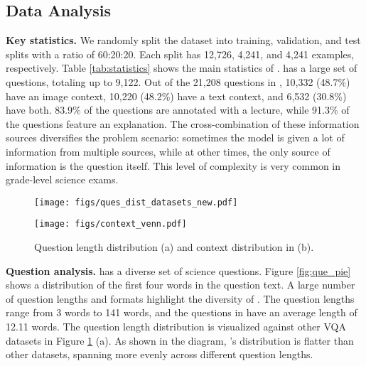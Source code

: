 \subsection{Data Analysis}

\textbf{Key statistics.} We randomly split the dataset into training, validation, and test splits with a ratio of 60:20:20. Each split has 12,726, 4,241, and 4,241 examples, respectively. Table \ref{tab:statistics} shows the main statistics of \name{}. \name{} has a large set of  questions, totaling up to 9,122. Out of the 21,208 questions in \name{}, 10,332 (48.7\%) have an image context, 10,220 (48.2\%) have a text context, and 6,532 (30.8\%) have both. 83.9\% of the questions are annotated with a lecture, while 91.3\% of the questions feature an explanation. The cross-combination of these information sources diversifies the problem scenario: sometimes the model is given a lot of information from multiple sources, while at other times, the only source of information is the question itself. This level of complexity is very common in grade-level science exams.

\begin{figure}[ht] 
\begin{minipage}{0.5\textwidth} 
 \centering
 \texttt{[image: figs/ques\_dist\_datasets\_new.pdf]}
\end{minipage}
 \hfill
 \begin{minipage}{0.4\textwidth} 
 \centering
 \texttt{[image: figs/context\_venn.pdf]}
 \end{minipage}
\caption{Question length distribution (a) and context distribution in \name{} (b).}
\label{fig:ques_dist_context}
\end{figure}

\textbf{Question analysis.}
\name{} has a diverse set of science questions. Figure \ref{fig:que_pie} shows a distribution of the first four words in the question text. A large number of question lengths and formats highlight the diversity of \name{}.
The question lengths range from 3 words to 141 words, and the questions in \name{} have an average length of 12.11 words. The question length distribution is visualized against  other VQA datasets in Figure \ref{fig:ques_dist_context} (a). As shown in the diagram, \name{}'s distribution is flatter than other datasets, spanning more evenly across different question lengths. 

